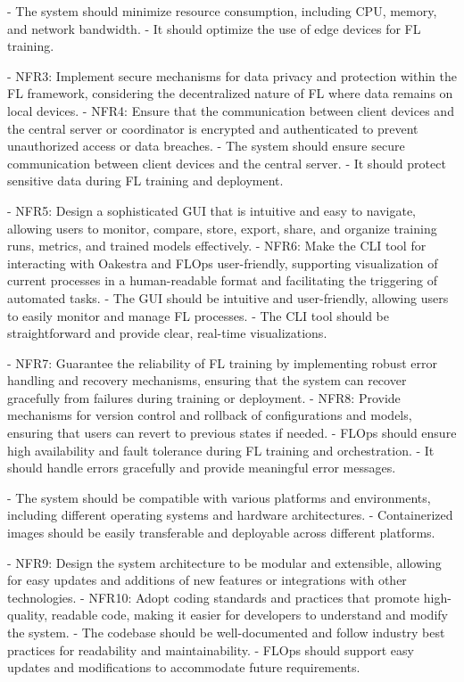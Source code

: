 - The system should minimize resource consumption, including CPU, memory, and network bandwidth.
- It should optimize the use of edge devices for FL training.

- NFR3: Implement secure mechanisms for data privacy and protection within the FL framework, considering the decentralized nature of FL where data remains on local devices.
- NFR4: Ensure that the communication between client devices and the central server or coordinator is encrypted and authenticated to prevent unauthorized access or data breaches.
- The system should ensure secure communication between client devices and the central server.
- It should protect sensitive data during FL training and deployment.

- NFR5: Design a sophisticated GUI that is intuitive and easy to navigate, allowing users to monitor, compare, store, export, share, and organize training runs, metrics, and trained models effectively.
- NFR6: Make the CLI tool for interacting with Oakestra and FLOps user-friendly, supporting visualization of current processes in a human-readable format and facilitating the triggering of automated tasks.
- The GUI should be intuitive and user-friendly, allowing users to easily monitor and manage FL processes.
- The CLI tool should be straightforward and provide clear, real-time visualizations.

- NFR7: Guarantee the reliability of FL training by implementing robust error handling and recovery mechanisms, ensuring that the system can recover gracefully from failures during training or deployment.
- NFR8: Provide mechanisms for version control and rollback of configurations and models, ensuring that users can revert to previous states if needed.
- FLOps should ensure high availability and fault tolerance during FL training and orchestration.
- It should handle errors gracefully and provide meaningful error messages.

- The system should be compatible with various platforms and environments, including different operating systems and hardware architectures.
- Containerized images should be easily transferable and deployable across different platforms.

- NFR9: Design the system architecture to be modular and extensible, allowing for easy updates and additions of new features or integrations with other technologies.
- NFR10: Adopt coding standards and practices that promote high-quality, readable code, making it easier for developers to understand and modify the system.
- The codebase should be well-documented and follow industry best practices for readability and maintainability.
- FLOps should support easy updates and modifications to accommodate future requirements.

